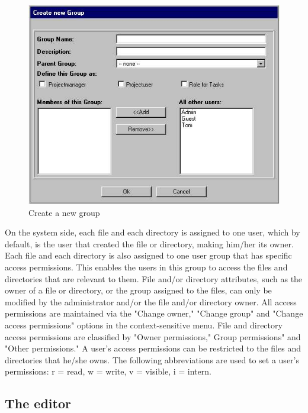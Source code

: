 \begin{figure}[hbt]
\begin{center}
\includegraphics[width=\sgw]
                   {pics/usermanual/newGroup}
\caption[Create a new group]
           {Create a new group}
\label{newgroup}
\end{center}
\end{figure}

On the system side, each file and each directory is assigned to
one user, which by default, is the user that created the file or
directory, making him/her its owner. Each file and each directory
is also assigned to one user group that has specific access
permissions. This enables the users in this group to access the
files and directories that are relevant to them. File and/or
directory attributes, such as the owner of a file or directory, or
the group assigned to the files, can only be modified by the
administrator and/or the file and/or directory owner. All access
permissions are maintained via the "Change owner," "Change group"
and "Change access permissions" options in the context-sensitive
menu. File and directory access permissions are classified by
"Owner permissions," Group permissions" and "Other permissions." A
user's access permissions can be restricted to the files and
directories that he/she owns. The following abbreviations are used
to set a user's permissions: r = read, w = write, v = visible, i =
intern.

\subsection{The editor}

